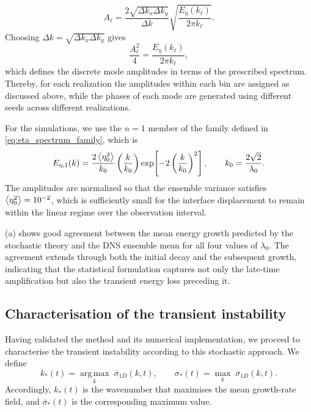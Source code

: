 \begin{equation}
  A_\ell
  =
  \frac{2\sqrt{\Delta k_x\Delta k_y}}{\Delta k}
  \sqrt{\frac{E_{\eta}(k_\ell)}{2\pi k_\ell}} .
  \label{eq:dns_discrete_shell_amplitude}
\end{equation}
Choosing \(\Delta k=\sqrt{\Delta k_x\Delta k_y}\) gives
\begin{equation}
  \frac{A_\ell^{2}}{4}
  =
  \frac{E_{\eta}(k_\ell)}{2\pi k_\ell},
  \label{eq:dns_final_mode_amplitude}
\end{equation}
which defines the discrete mode amplitudes in terms of the prescribed spectrum. Thereby, for each
realization the amplitudes within each bin are assigned as discussed above, while the phases of
each mode are generated using different seeds across different realizations.

For the simulations, we use the \(n=1\) member of the family defined in
\eqref{eq:eta_spectrum_family}, which is
\begin{equation}
  E_{\eta,1}(k)
  =
  \frac{2\left\langle \eta_0^2 \right\rangle}{k_0}
  \left(\frac{k}{k_0}\right)
  \exp\!\left[-2\left(\frac{k}{k_0}\right)^2\right],
  \qquad
  k_0=\frac{2\sqrt{2}}{\lambda_0}.
  \label{eq:dns_initial_spectrum}
\end{equation}
The amplitudes are normalized so that the ensemble variance satisfies
\(\left\langle \eta_0^2 \right\rangle=10^{-2}\), which is sufficiently small for the interface displacement to remain
within the linear regime over the observation interval.


(a) shows good agreement between the mean energy growth predicted by the
stochastic theory and the DNS ensemble mean for all four values of \(\lambda_0\). The agreement
extends through both the initial decay and the subsequent growth, indicating that the statistical
formulation captures not only the late-time amplification but also the transient energy loss
preceding it.

\subsection{Characterisation of the transient instability}
\label{subsec:transient_characterisation}
Having validated the method and its numerical implementation, we proceed to characterise the
transient instability according to this stochastic approach. We define
\begin{equation}
  k_\ast(t)=\underset{k}{\operatorname{arg\,max}}\;\overline{\sigma}_{1D}(k,t),
  \qquad
  \overline{\sigma}_\ast(t)=\underset{k}{\max}\;\overline{\sigma}_{1D}(k,t).
  \label{eq:maximum_growth_definitions}
\end{equation}
Accordingly, \(k_\ast(t)\) is the wavenumber that maximises the mean growth-rate field, and
\(\overline{\sigma}_\ast(t)\) is the corresponding maximum value.

